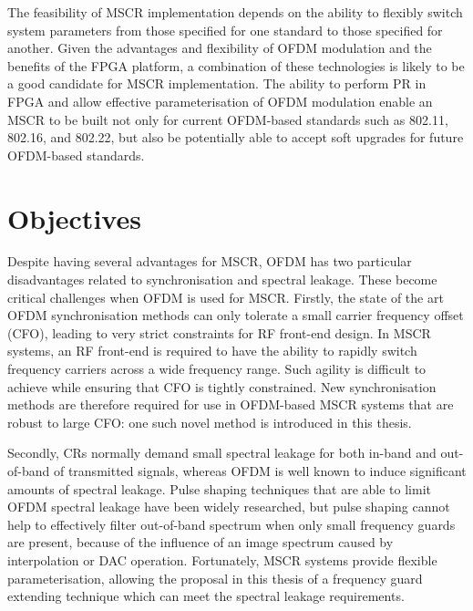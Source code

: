 The feasibility of MSCR implementation depends on the ability to flexibly switch system parameters from those specified for one standard to those specified for another.
Given the advantages and flexibility of OFDM modulation and the benefits of the FPGA platform, a combination of these technologies is likely to be a good candidate for MSCR implementation.
The ability to perform PR in FPGA and allow effective parameterisation of OFDM modulation enable an MSCR to be built not only for current OFDM-based standards such as 802.11, 802.16, and 802.22, but also be potentially able to accept soft upgrades for future OFDM-based standards.

\section{Objectives}

Despite having several advantages for MSCR, OFDM has two particular disadvantages related to synchronisation and spectral leakage. These become critical challenges when OFDM is used for MSCR.
Firstly, the state of the art OFDM synchronisation methods can only tolerate a small carrier frequency offset (CFO),  leading to very strict constraints for RF front-end design.
In MSCR systems, an RF front-end is required to have the ability to rapidly switch frequency carriers across a wide frequency range.
Such agility is difficult to achieve while ensuring that CFO is tightly constrained.
New synchronisation methods are therefore required for use in OFDM-based MSCR systems that are robust to large CFO: one such novel method is introduced in this thesis.

Secondly, CRs normally demand small spectral leakage for both in-band and out-of-band of transmitted signals, whereas OFDM is well known to induce significant amounts of spectral leakage.
Pulse shaping techniques that are able to limit OFDM spectral leakage have been widely researched, but pulse shaping cannot help to effectively filter out-of-band spectrum when only small frequency guards are present, because of the influence of an image spectrum caused by interpolation or DAC operation.
Fortunately, MSCR systems provide flexible parameterisation, allowing the proposal in this thesis of a frequency guard extending technique which can meet the spectral leakage requirements.

